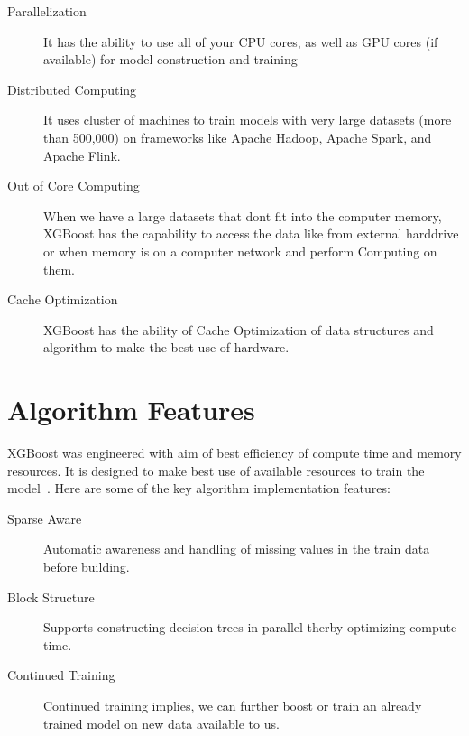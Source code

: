 \begin{description}
\item[Parallelization]

It has the ability to use all of your CPU cores, as well as GPU cores (if
available) for model construction and training

\item[Distributed Computing]

It uses cluster of machines to train models with very large datasets (more than
500,000) on frameworks like Apache Hadoop, Apache Spark, and Apache Flink.

\item[Out of Core Computing]

When we have a large datasets that dont fit into the computer memory, XGBoost
has the capability to access the data  like from external harddrive or when
memory is on a computer network and perform Computing on them.

\item[Cache Optimization]

XGBoost has the ability of Cache Optimization of data structures and algorithm
to make the best use of hardware.

\end{description}


\section{Algorithm Features} 

XGBoost was engineered with aim of best efficiency of compute time and memory
resources. It is designed to make best use of available resources to train the
model~\cite{hid-sp18-401-XGBoost-MLmastery}. Here are some of the key algorithm
implementation features:

\begin{description}

\item[Sparse Aware]

Automatic awareness and handling of missing values in the train data before 
building.

\item[Block Structure]

Supports constructing decision trees in parallel therby optimizing compute
time.

\item[Continued Training] 

Continued training implies, we can further boost or train an already trained
model on new data available to us.

\end{description}



